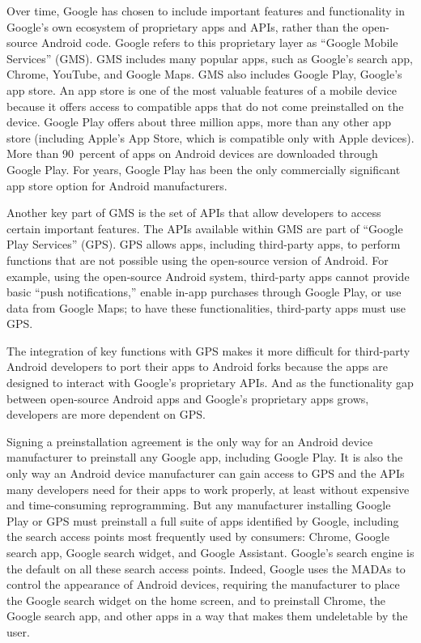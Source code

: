 \documentclass[11pt,b5paper,headings=small]{scrartcl}
\begin{document}

Over time, Google has chosen to include important features and functionality in
Google’s own ecosystem of proprietary apps and APIs, rather than the open-source Android
code. Google refers to this proprietary layer as “Google Mobile Services” (GMS). GMS includes
many popular apps, such as Google’s search app, Chrome, YouTube, and Google Maps. GMS
also includes Google Play, Google’s app store. An app store is one of the most valuable features
of a mobile device because it offers access to compatible apps that do not come preinstalled on
the device. Google Play offers about three million apps, more than any other app store (including
Apple’s App Store, which is compatible only with Apple devices). More than 90~percent of apps
on Android devices are downloaded through Google Play. For years, Google Play has been the
only commercially significant app store option for Android manufacturers.


Another key part of GMS is the set of APIs that allow developers to access certain
important features. The APIs available within GMS are part of “Google Play Services” (GPS).
GPS allows apps, including third-party apps, to perform functions that are not possible using the
open-source version of Android. For example, using the open-source Android system, third-party
apps cannot provide basic “push notifications,” enable in-app purchases through Google Play, or
use data from Google Maps; to have these functionalities, third-party apps must use GPS.


The integration of key functions with GPS makes it more difficult for third-party
Android developers to port their apps to Android forks because the apps are designed to interact
with Google’s proprietary APIs. And as the functionality gap between open-source Android apps
and Google’s proprietary apps grows, developers are more dependent on GPS.


Signing a preinstallation agreement is the only way for an Android device
manufacturer to preinstall any Google app, including Google Play. It is also the only way an
Android device manufacturer can gain access to GPS and the APIs many developers need for
their apps to work properly, at least without expensive and time-consuming reprogramming. But
any manufacturer installing Google Play or GPS must preinstall a full suite of apps identified by
Google, including the search access points most frequently used by consumers: Chrome, Google
search app, Google search widget, and Google Assistant. Google’s search engine is the default
on all these search access points. Indeed, Google uses the MADAs to control the appearance of
Android devices, requiring the manufacturer to place the Google search widget on the home
screen, and to preinstall Chrome, the Google search app, and other apps in a way that makes
them undeletable by the user.
\end{document}
